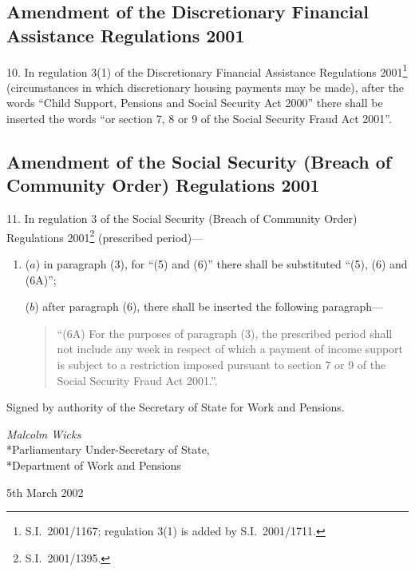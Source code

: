 \documentclass[12pt,a4paper]{article}
\begin{document}
\subsection[10. Amendment of the Discretionary Financial Assistance Regulations 2001]{Amendment of the Discretionary Financial Assistance Regulations 2001}

10.  In regulation 3(1) of the Discretionary Financial Assistance Regulations 2001\footnote{S.I.\ 2001/1167; regulation 3(1) is added by S.I.\ 2001/1711.} (circumstances in which discretionary housing payments may be made), after the words “Child Support, Pensions and Social Security Act 2000” there shall be inserted the words “or section 7, 8 or 9 of the Social Security Fraud Act 2001”.

\subsection[11. Amendment of the Social Security (Breach of Community Order) Regulations 2001]{Amendment of the Social Security (Breach of Community Order) Regulations 2001}

11.  In regulation 3 of the Social Security (Breach of Community Order) Regulations 2001\footnote{S.I.\ 2001/1395.} (prescribed period)—
\begin{enumerate}\item[]
($a$) in paragraph (3), for “(5) and (6)” there shall be substituted “(5), (6) and (6A)”;

($b$) after paragraph (6), there shall be inserted the following paragraph—
\begin{quotation}
“(6A) For the purposes of paragraph (3), the prescribed period shall not include any week in respect of which a payment of income support is subject to a restriction imposed pursuant to section 7 or 9 of the Social Security Fraud Act 2001.”.
\end{quotation}
\end{enumerate}

\bigskip

Signed 
by authority of the Secretary of State for Work and Pensions.

{\raggedleft
\emph{Malcolm Wicks}\\*Parliamentary Under-Secretary of State,\\*Department of Work and Pensions

}


5th March 2002
\end{document}
